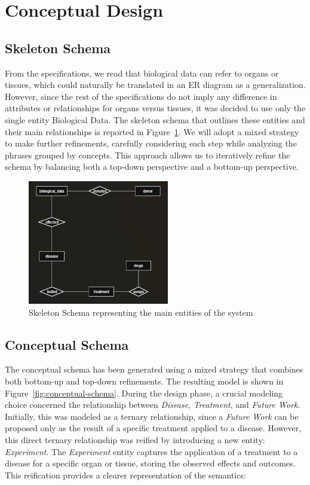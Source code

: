 \documentclass[11pt,a4paper]{article}
\begin{document}
\section{Conceptual Design}
\subsection{Skeleton Schema}

From the specifications, we read that biological data can refer to organs or tissues, which could naturally be translated in an ER diagram as a generalization. However, since the rest of the specifications do not imply any difference in attributes or relationships for organs versus tissues, it was decided to use only the single entity Biological Data.
The skeleton schema that outlines these entities and their main relationships is reported in Figure~\ref{fig:skeleton-schema}.
We will adopt a mixed strategy to make further refinements, carefully considering each step while analyzing the phrases grouped by concepts. This approach allows us to iteratively refine the schema by balancing both a top-down perspective and a bottom-up perspective.

\begin{figure}[H]
\centering
\includegraphics[width=0.55\textwidth]{img/skeleton.drawio.png}
\caption{Skeleton Schema representing the main entities of the system}
\label{fig:skeleton-schema}
\end{figure}

\subsection{Conceptual Schema}
The conceptual schema has been generated using a mixed strategy that combines both bottom-up and top-down refinements. The resulting model is shown in Figure~\ref{fig:conceptual-schema}.
During the design phase, a crucial modeling choice concerned the relationship between \textit{Disease}, \textit{Treatment}, and \textit{Future Work}. Initially, this was modeled as a ternary relationship, since a \textit{Future Work} can be proposed only as the result of a specific treatment applied to a disease. However, this direct ternary relationship was reified by introducing a new entity: \textit{Experiment}.
The \textit{Experiment} entity captures the application of a treatment to a disease for a specific organ or tissue, storing the observed effects and outcomes. This reification provides a clearer representation of the semantics:
\end{document}
